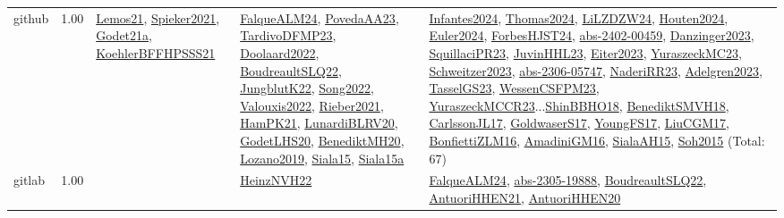 {\begin{longtable}{p{3cm}r>{\raggedright\arraybackslash}p{6cm}>{\raggedright\arraybackslash}p{6cm}>{\raggedright\arraybackslash}p{8cm}}
\index{github}\index{Benchmarks!github}github &  1.00 & \hyperref[detail:Lemos21]{Lemos21}, \hyperref[detail:Spieker2021]{Spieker2021}, \hyperref[detail:Godet21a]{Godet21a}, \hyperref[detail:KoehlerBFFHPSSS21]{KoehlerBFFHPSSS21} & \hyperref[detail:FalqueALM24]{FalqueALM24}, \hyperref[detail:PovedaAA23]{PovedaAA23}, \hyperref[detail:TardivoDFMP23]{TardivoDFMP23}, \hyperref[detail:Doolaard2022]{Doolaard2022}, \hyperref[detail:BoudreaultSLQ22]{BoudreaultSLQ22}, \hyperref[detail:JungblutK22]{JungblutK22}, \hyperref[detail:Song2022]{Song2022}, \hyperref[detail:Valouxis2022]{Valouxis2022}, \hyperref[detail:Rieber2021]{Rieber2021}, \hyperref[detail:HamPK21]{HamPK21}, \hyperref[detail:LunardiBLRV20]{LunardiBLRV20}, \hyperref[detail:GodetLHS20]{GodetLHS20}, \hyperref[detail:BenediktMH20]{BenediktMH20}, \hyperref[detail:Lozano2019]{Lozano2019}, \hyperref[detail:Siala15]{Siala15}, \hyperref[detail:Siala15a]{Siala15a} & \hyperref[detail:Infantes2024]{Infantes2024}, \hyperref[detail:Thomas2024]{Thomas2024}, \hyperref[detail:LiLZDZW24]{LiLZDZW24}, \hyperref[detail:Houten2024]{Houten2024}, \hyperref[detail:Euler2024]{Euler2024}, \hyperref[detail:ForbesHJST24]{ForbesHJST24}, \hyperref[detail:abs-2402-00459]{abs-2402-00459}, \hyperref[detail:Danzinger2023]{Danzinger2023}, \hyperref[detail:SquillaciPR23]{SquillaciPR23}, \hyperref[detail:JuvinHHL23]{JuvinHHL23}, \hyperref[detail:Eiter2023]{Eiter2023}, \hyperref[detail:YuraszeckMC23]{YuraszeckMC23}, \hyperref[detail:Schweitzer2023]{Schweitzer2023}, \hyperref[detail:abs-2306-05747]{abs-2306-05747}, \hyperref[detail:NaderiRR23]{NaderiRR23}, \hyperref[detail:Adelgren2023]{Adelgren2023}, \hyperref[detail:TasselGS23]{TasselGS23}, \hyperref[detail:WessenCSFPM23]{WessenCSFPM23}, \hyperref[detail:YuraszeckMCCR23]{YuraszeckMCCR23}...\hyperref[detail:ShinBBHO18]{ShinBBHO18}, \hyperref[detail:BenediktSMVH18]{BenediktSMVH18}, \hyperref[detail:CarlssonJL17]{CarlssonJL17}, \hyperref[detail:GoldwaserS17]{GoldwaserS17}, \hyperref[detail:YoungFS17]{YoungFS17}, \hyperref[detail:LiuCGM17]{LiuCGM17}, \hyperref[detail:BonfiettiZLM16]{BonfiettiZLM16}, \hyperref[detail:AmadiniGM16]{AmadiniGM16}, \hyperref[detail:SialaAH15]{SialaAH15}, \hyperref[detail:Soh2015]{Soh2015} (Total: 67)\\
\index{gitlab}\index{Benchmarks!gitlab}gitlab &  1.00 &  & \hyperref[detail:HeinzNVH22]{HeinzNVH22} & \hyperref[detail:FalqueALM24]{FalqueALM24}, \hyperref[detail:abs-2305-19888]{abs-2305-19888}, \hyperref[detail:BoudreaultSLQ22]{BoudreaultSLQ22}, \hyperref[detail:AntuoriHHEN21]{AntuoriHHEN21}, \hyperref[detail:AntuoriHHEN20]{AntuoriHHEN20}\\

\end{longtable}}
